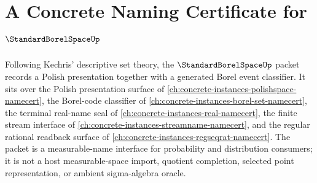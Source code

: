 \chapter{A Concrete Naming Certificate for $\StandardBorelSpaceUp$}
\label{ch:concrete-instances-standard-borel-space-namecert}

Following Kechris' descriptive set theory, the $\StandardBorelSpaceUp$ packet records a Polish presentation together with a generated Borel event classifier. It sits over the Polish presentation surface of \autoref{ch:concrete-instances-polishspace-namecert}, the Borel-code classifier of \autoref{ch:concrete-instances-borel-set-namecert}, the terminal real-name seal of \autoref{ch:concrete-instances-real-namecert}, the finite stream interface of \autoref{ch:concrete-instances-streamname-namecert}, and the regular rational readback surface of \autoref{ch:concrete-instances-regseqrat-namecert}. The packet is a measurable-name interface for probability and distribution consumers; it is not a host measurable-space import, quotient completion, selected point representation, or ambient sigma-algebra oracle.

